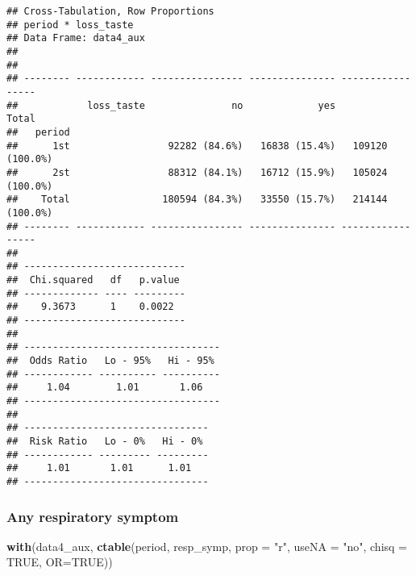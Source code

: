 \documentclass[
]{article}
\newenvironment{Shaded}{\begin{snugshade}}{\end{snugshade}}
\newcommand{\DataTypeTok}[1]{\textcolor[rgb]{0.13,0.29,0.53}{#1}}
\newcommand{\KeywordTok}[1]{\textcolor[rgb]{0.13,0.29,0.53}{\textbf{#1}}}
\newcommand{\NormalTok}[1]{#1}
\newcommand{\OtherTok}[1]{\textcolor[rgb]{0.56,0.35,0.01}{#1}}
\newcommand{\StringTok}[1]{\textcolor[rgb]{0.31,0.60,0.02}{#1}}
\begin{document}
\begin{verbatim}
## Cross-Tabulation, Row Proportions  
## period * loss_taste  
## Data Frame: data4_aux  
## 
## 
## -------- ------------ ---------------- --------------- -----------------
##            loss_taste               no             yes             Total
##   period                                                                
##      1st                 92282 (84.6%)   16838 (15.4%)   109120 (100.0%)
##      2st                 88312 (84.1%)   16712 (15.9%)   105024 (100.0%)
##    Total                180594 (84.3%)   33550 (15.7%)   214144 (100.0%)
## -------- ------------ ---------------- --------------- -----------------
## 
## ----------------------------
##  Chi.squared   df   p.value 
## ------------- ---- ---------
##    9.3673      1    0.0022  
## ----------------------------
## 
## ----------------------------------
##  Odds Ratio   Lo - 95%   Hi - 95% 
## ------------ ---------- ----------
##     1.04        1.01       1.06   
## ----------------------------------
## 
## --------------------------------
##  Risk Ratio   Lo - 0%   Hi - 0% 
## ------------ --------- ---------
##     1.01       1.01      1.01   
## --------------------------------
\end{verbatim}

\hypertarget{any-respiratory-symptom}{%
\subsubsection{Any respiratory symptom}\label{any-respiratory-symptom}}

\begin{Shaded}
\begin{Highlighting}[]
\KeywordTok{with}\NormalTok{(data4_aux, }\KeywordTok{ctable}\NormalTok{(period, resp_symp, }\DataTypeTok{prop =} \StringTok{"r"}\NormalTok{, }\DataTypeTok{useNA =} \StringTok{"no"}\NormalTok{, }\DataTypeTok{chisq =} \OtherTok{TRUE}\NormalTok{, }\DataTypeTok{OR=}\OtherTok{TRUE}\NormalTok{))}
\end{Highlighting}
\end{Shaded}
\end{document}
